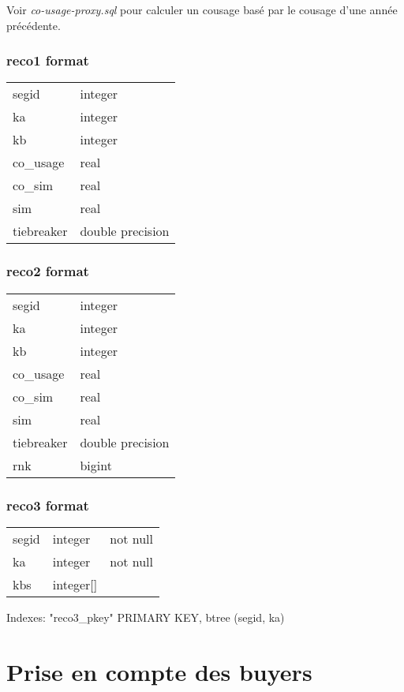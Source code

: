 \documentclass[a4paper,11pt]{article}
\begin{document}
Voir \emph{co-usage-proxy.sql} pour calculer un cousage basé par le cousage d'une année précédente.

\subsubsection{reco1 format}
\begin{tabular}{ll}
segid      & integer          \\
 ka         & integer         \\ 
 kb         & integer         \\ 
 co\_usage   & real           \\ 
 co\_sim     & real           \\ 
 sim        & real            \\ 
 tiebreaker & double precision 
\end{tabular}

\subsubsection{reco2 format}
\begin{tabular}{ll}
segid      & integer          \\
 ka         & integer         \\ 
 kb         & integer         \\ 
 co\_usage   & real           \\ 
 co\_sim     & real           \\ 
 sim        & real            \\ 
 tiebreaker & double precision \\
 rnk        & bigint
\end{tabular}

\subsubsection{reco3 format}
\begin{tabular}{lll}
 segid  & integer   & not null \\
 ka     & integer   & not null \\
 kbs    & integer[] & 
\end{tabular}

Indexes:
    "reco3\_pkey" PRIMARY KEY, btree (segid, ka)


\section{Prise en compte des buyers}
\end{document}
